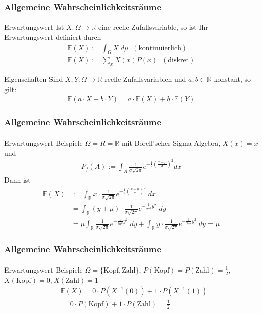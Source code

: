 \documentclass{beamer}
\begin{document}
\begin{frame}
    \frametitle{Allgemeine Wahrscheinlichkeitsräume}
\framesubtitle{}
\begin{block}{Erwartungswert}
Ist $X : \Omega \to \mathbb{R}$  eine reelle Zufallsvariable, so ist Ihr Erwartungswert definiert durch
\begin{align*}
\mathbb{E}(X) := \int_\Omega X \; d\mu \; \; ( \text{kontinuierlich})  \\
\mathbb{E}(X) := \sum_{x} X(x) P(x) \; \; ( \text{diskret}) 
\end{align*}
\end{block}
\begin{block}{Eigenschaften}
Sind $X,Y : \Omega \to \mathbb{R}$   reelle Zufallsvariablen und $a,b \in \mathbb{R}$ konstant, so gilt:
\begin{align*}
\mathbb{E}(a \cdot X + b \cdot Y) = a \cdot \mathbb{E}(X) + b \cdot \mathbb{E}(Y) 
\end{align*}
\end{block}

 \end{frame}

\begin{frame}
    \frametitle{Allgemeine Wahrscheinlichkeitsräume}
\framesubtitle{}
\begin{block}{Erwartungswert Beispiele}
$\Omega = R = \mathbb{R}$ mit Borell'scher Sigma-Algebra, $X(x) = x$ und
\begin{align*}
P_f (A) := \int_{A}  \frac 1{\sigma \sqrt{2\pi}}e^{- \frac {1}{2 } (\frac{x- \mu}{ \sigma})^2}dx
\end{align*}
Dann ist 
\begin{align*}
\mathbb{E}(X) & := \int_{\mathbb{R}}  x \cdot  \frac 1{\sigma \sqrt{2\pi}}e^{- \frac {1}{2 } (\frac{x- \mu}{ \sigma})^2} \; dx  \\
&= \int_{\mathbb{R}}  (y + \mu) \cdot  \frac 1{\sigma \sqrt{2\pi}}e^{- \frac {1}{2 \sigma^2} y^2} \; dy \\
 &  = \mu  \int_{\mathbb{R}}      \frac 1{\sigma \sqrt{2\pi}}e^{- \frac {1}{2 \sigma^2} y^2} \; dy  + \int_{\mathbb{R}}  y  \cdot  \frac 1{\sigma \sqrt{2\pi}}e^{- \frac {1}{2 \sigma^2} y^2} \; dy = \mu
\end{align*}
\end{block}
 \end{frame}

\begin{frame}
    \frametitle{Allgemeine Wahrscheinlichkeitsräume}
\framesubtitle{}
\begin{block}{Erwartungswert Beispiele}
$\Omega = \{ \text{Kopf},\text{Zahl}\}$, $P(\text{Kopf}) = P(\text{Zahl}) = \frac{1}{2}$, $X(\text{Kopf}) = 0,  X(\text{Zahl}) = 1$ 
\begin{align*}
& \mathbb{E}(X)  = 0 \cdot P(X^{-1}(0) ) + 1 \cdot P(X^{-1}(1)) \\
& =0  \cdot P(\text{Kopf}) + 1 \cdot P(\text{Zahl}) = \frac{1}{2}  
\end{align*}
\end{block}

 \end{frame}
\end{document}
